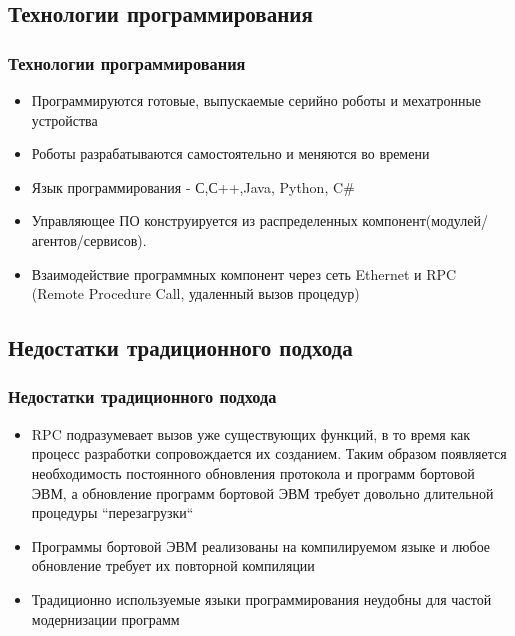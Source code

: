 \documentclass{beamer}
\begin{document}
\subsection{Технологии программирования}
\begin{frame}
\frametitle{Технологии программирования}
\begin{itemize}
\item<1> Программируются готовые, выпускаемые серийно роботы и мехатронные
устройства
\item<2> \alert{Роботы разрабатываются самостоятельно и меняются во времени} 
\item<1-> Язык программирования - С,С++,Java, Python, C\#
\item<1-> Управляющее ПО конструируется из распределенных
компонент(модулей/агентов/сервисов).
\item<1-> Взаимодействие программных компонент через сеть Ethernet и RPC
(Remote Procedure Call, удаленный вызов процедур)
\end{itemize}
\end{frame}


\subsection{Недостатки традиционного подхода}
\begin{frame}
\frametitle{Недостатки традиционного подхода}
\begin{itemize}
  \item<1-> RPC подразумевает вызов уже существующих функций, в то время как
  процесс разработки сопровождается их созданием. Таким образом появляется
  необходимость постоянного обновления протокола и программ бортовой ЭВМ, а 
  обновление программ бортовой ЭВМ требует довольно длительной
  процедуры ``перезагрузки``  
  \item<1->Программы бортовой ЭВМ реализованы на компилируемом языке и
  любое обновление требует их повторной компиляции
  \item<1-> Традиционно используемые языки программирования неудобны для частой
  модернизации программ
\end{itemize}
\end{frame}
\end{document}
